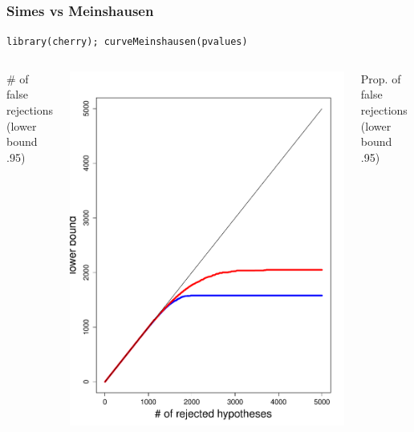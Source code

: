 \documentclass[xcolor={pdftex,dvipsnames,table}]{beamer}
\begin{document}
\begin{frame}
\frametitle{Simes vs Meinshausen}
\textcolor{myblue}{\tt library(cherry);  curveMeinshausen(pvalues) }\\
\bigskip

\begin{columns}
\# of false rejections\\ (lower bound .95) 


\includegraphics[scale=.25]{figures_perm_covariates/ALL_numbers2}

Prop. of false rejections\\ (lower bound .95)


\end{columns}
\end{frame}
\end{document}
